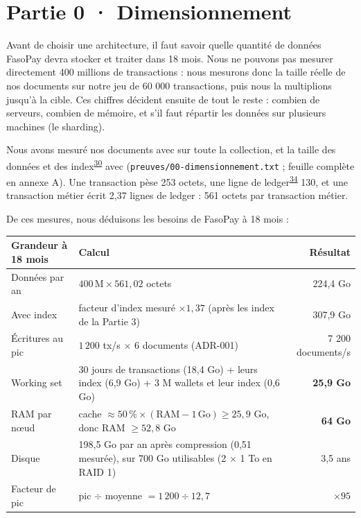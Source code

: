 \documentclass[11pt,a4paper]{article}
\newcommand{\code}[1]{\texttt{\detokenize{#1}}}
\newcommand{\gl}[1]{\textsuperscript{\hyperlink{lex#1}{#1}}}
\newcommand{\preuve}[1]{\texttt{preuves/#1}}
\begin{document}
	\section{Partie 0 · Dimensionnement}
	
	Avant de choisir une architecture, il faut savoir quelle quantité de données FasoPay devra stocker et traiter dans 18 mois. Nous ne pouvons pas mesurer directement 400 millions de transactions : nous mesurons donc la taille réelle de nos documents sur notre jeu de 60 000 transactions, puis nous la multiplions jusqu'à la cible. Ces chiffres décident ensuite de tout le reste : combien de serveurs, combien de mémoire, et s'il faut répartir les données sur plusieurs machines (le sharding).
	
	Nous avons mesuré nos documents avec \code{$bsonSize} sur toute la collection, et la taille des données et des index\gl{30} avec \code{$collStats} (\preuve{00-dimensionnement.txt} ; feuille complète en annexe A). Une transaction pèse 253 octets, une ligne de ledger\gl{34} 130, et une transaction métier écrit 2,37 lignes de ledger : 561 octets par transaction métier.
	
	De ces mesures, nous déduisons les besoins de FasoPay à 18 mois :
	
	\begin{center}\small
		\begin{tabularx}{\linewidth}{@{}lLr@{}}
			\toprule
			\textbf{Grandeur à 18 mois} & \textbf{Calcul} & \textbf{Résultat} \\
			\midrule
			Données par an & $400\,\text{M} \times 561{,}02$ octets & 224,4 Go \\
			Avec index & facteur d'index mesuré $\times 1{,}37$ (après les index de la Partie 3) & 307,9 Go \\
			Écritures au pic & $1\,200$ tx/s $\times$ 6 documents (ADR-001) & 7 200 documents/s \\
			Working set & 30 jours de transactions (18,4 Go) + leurs index (6,9 Go) + 3 M wallets et leur index (0,6 Go) & \textbf{25,9 Go} \\
			RAM par nœud & cache $\approx 50\,\% \times (\text{RAM} - 1\,\text{Go}) \geq 25{,}9$ Go, donc RAM $\geq 52{,}8$ Go & \textbf{64 Go} \\
			Disque & 198,5 Go par an après compression (0,51 mesurée), sur 700 Go utilisables (2 × 1 To en RAID 1) & 3,5 ans \\
			Facteur de pic & pic $\div$ moyenne $= 1\,200 \div 12{,}7$ & $\times 95$ \\
			\bottomrule
		\end{tabularx}
	\end{center}
	
\end{document}
